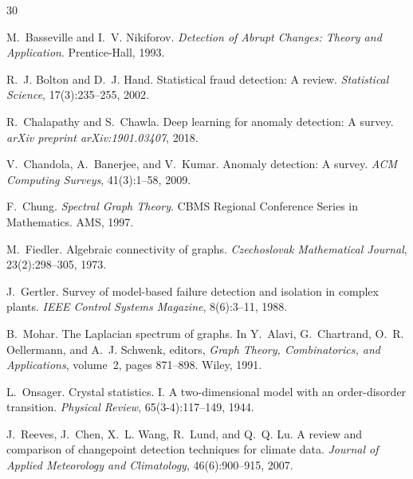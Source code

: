 \documentclass[11pt,a4paper]{article}
\begin{document}

\begin{thebibliography}{30}

M.~Basseville and I.~V. Nikiforov.
\newblock \emph{Detection of Abrupt Changes: Theory and Application}.
\newblock Prentice-Hall, 1993.

R.~J. Bolton and D.~J. Hand.
\newblock Statistical fraud detection: A review.
\newblock \emph{Statistical Science}, 17(3):235--255, 2002.

R.~Chalapathy and S.~Chawla.
\newblock Deep learning for anomaly detection: A survey.
\newblock \emph{arXiv preprint arXiv:1901.03407}, 2018.

V.~Chandola, A.~Banerjee, and V.~Kumar.
\newblock Anomaly detection: A survey.
\newblock \emph{ACM Computing Surveys}, 41(3):1--58, 2009.

F.~Chung.
\newblock \emph{Spectral Graph Theory}.
\newblock CBMS Regional Conference Series in Mathematics. AMS, 1997.

M.~Fiedler.
\newblock Algebraic connectivity of graphs.
\newblock \emph{Czechoslovak Mathematical Journal}, 23(2):298--305, 1973.

J.~Gertler.
\newblock Survey of model-based failure detection and isolation in complex plants.
\newblock \emph{IEEE Control Systems Magazine}, 8(6):3--11, 1988.

B.~Mohar.
\newblock The Laplacian spectrum of graphs.
\newblock In Y.~Alavi, G.~Chartrand, O.~R. Oellermann, and A.~J. Schwenk,
  editors, \emph{Graph Theory, Combinatorics, and Applications}, volume~2,
  pages 871--898. Wiley, 1991.

L.~Onsager.
\newblock Crystal statistics. {I}. {A} two-dimensional model with an
  order-disorder transition.
\newblock \emph{Physical Review}, 65(3-4):117--149, 1944.

J.~Reeves, J.~Chen, X.~L. Wang, R.~Lund, and Q.~Q. Lu.
\newblock A review and comparison of changepoint detection techniques for
  climate data.
\newblock \emph{Journal of Applied Meteorology and Climatology}, 46(6):900--915,
  2007.


\end{thebibliography}
\end{document}
